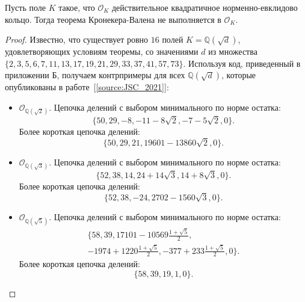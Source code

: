 \documentclass[_00_dissertation.tex]{subfiles}
\begin{document}
\begin{theorem}\label{theorem:kronecker}
    Пусть поле $K$ такое, что $\mathcal{O}_K$ действительное квадратичное норменно-евклидово кольцо.
    Тогда теорема Кронекера-Валена не выполняется в $\mathcal{O}_K$.
\end{theorem}
\begin{proof}
    Известно, что существует ровно $16$ полей $K = \mathbb{Q}(\sqrt{d})$, удовлетворяющих условиям теоремы, со значениями $d$ из множества $\{2, 3, 5, 6, 7, 11, 13, 17, 19, 21, 29, 33, 37, 41, 57, 73\}$.
    Используя код, приведенный в приложении Б, получаем контрпримеры для всех $\mathbb{Q}(\sqrt{d})$, которые опубликованы в работе~[\ref{source:JSC_2021}]:
    \begin{itemize}
        \item $\mathcal{O}_{\mathbb{Q}(\sqrt{2})}$.
        Цепочка делений с выбором минимального по норме остатка:
        \begin{equation*}
            \{50, 29, -8, -11-8\sqrt{2}, -7-5\sqrt{2}, 0\}.
        \end{equation*}
        Более короткая цепочка делений:
        \begin{equation*}
            \{50, 29, 21, 19601-13860\sqrt{2}, 0\}.
        \end{equation*}
    
        \item $\mathcal{O}_{\mathbb{Q}(\sqrt{3})}$.
        Цепочка делений с выбором минимального по норме остатка:
        \begin{equation*}
            \{52, 38, 14, 24+14\sqrt{3}, 14+8\sqrt{3}, 0\}.
        \end{equation*}
        Более короткая цепочка делений:
        \begin{equation*}
            \{52, 38, -24, 2702-1560\sqrt{3}, 0\}.
        \end{equation*}
    
        \item $\mathcal{O}_{\mathbb{Q}(\sqrt{5})}$.
        Цепочка делений с выбором минимального по норме остатка:
        \begin{multline*}
            \{58, 39, 17101-10569\frac{1+\sqrt{5}}{2},\\
            -1974+1220\frac{1+\sqrt{5}}{2}, -377+233\frac{1+\sqrt{5}}{2}, 0\}.
        \end{multline*}
        Более короткая цепочка делений:
        \begin{equation*}
            \{58, 39, 19, 1, 0\}.
        \end{equation*}
    

\end{itemize}
\end{proof}
\end{document}
